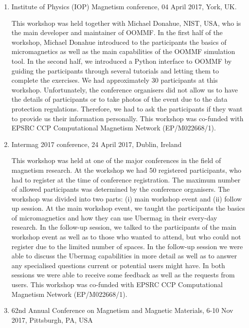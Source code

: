 \documentclass{deliverablereport}
\begin{document}
\begin{enumerate}
  
\item Institute of Physics (IOP) Magnetism conference, 04 April 2017, York, UK.

  This workshop was held together with Michael Donahue, NIST, USA, who is the main developer and maintainer of OOMMF. In the first half of the workshop, Michael Donahue introduced to the participants the basics of micromagnetics as well as the main capabilities of the OOMMF simulation tool. In the second half, we introduced a Python interface to OOMMF by guiding the participants through several tutorials and letting them to complete the exercises. We had approximately 30 participants at this workshop. Unfortunately, the conference organisers did not allow us to have the details of participants or to take photos of the event due to the data protection regulations. Therefore, we had to ask the participants if they want to provide us their information personally. This workshop was co-funded with EPSRC CCP Computational Magnetism Network (EP/M022668/1).

\item Intermag 2017 conference, 24 April 2017, Dublin, Ireland

  This workshop was held at one of the major conferences in the field of magnetism research. At the workshop we had 50 registered participants, who had to register at the time of conference registration. The maximum number of allowed participants was determined by the conference organisers. The workshop was divided into two parts: (i) main workshop event and (ii) follow up session. At the main workshop event, we taught the participants the basics of micromagnetics and how they can use Ubermag in their every-day research. In the follow-up session, we talked to the participants of the main workshop event as well as to those who wanted to attend, but who could not register due to the limited number of spaces. In the follow-up session we were able to discuss the Ubermag capabilities in more detail as well as to answer any specialised questions current or potential users might have. In both sessions we were able to receive some feedback as well as the requests from users. This workshop was co-funded with EPSRC CCP Computational Magnetism Network (EP/M022668/1).
  
\item 62nd Annual Conference on Magnetism and Magnetic Materials, 6-10 Nov 2017, Pittsburgh, PA, USA


\end{enumerate}
\end{document}
